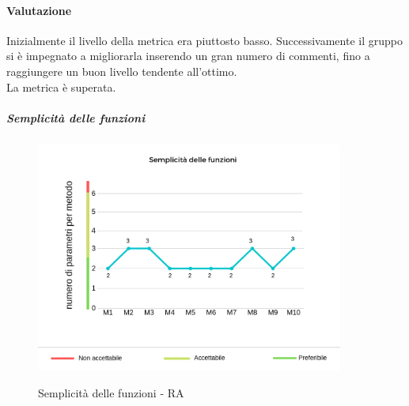 	\paragraph*{Valutazione} Inizialmente il livello della metrica era piuttosto basso. Successivamente il gruppo si è impegnato a migliorarla inserendo un gran numero di commenti, fino a raggiungere un buon livello tendente all'ottimo.
	\\ La metrica è superata.
	\pagebreak
	\subparagraph{Semplicità delle funzioni}
	\begin{center}
		\begin{figure}[h] 
			\centering 
			\includegraphics[width=0.90\textwidth]{res/images/new/semplicitaFunzioni.png}\\
			\caption{Semplicità delle funzioni - RA}
		\end{figure}
	\end{center}
